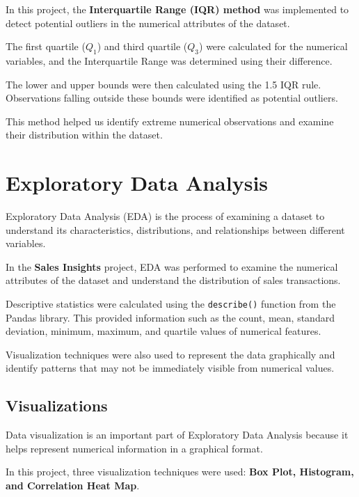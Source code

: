 \documentclass[12pt,a4paper]{report}
\begin{document}
In this project, the
\textbf{Interquartile Range (IQR) method}
was implemented to detect potential
outliers in the numerical attributes
of the dataset.

The first quartile ($Q_1$) and third
quartile ($Q_3$) were calculated for
the numerical variables, and the
Interquartile Range was determined
using their difference.

The lower and upper bounds were
then calculated using the
1.5 IQR rule. Observations falling
outside these bounds were identified
as potential outliers.

This method helped us identify
extreme numerical observations
and examine their distribution
within the dataset.

\endgroup

\chapter{Exploratory Data Analysis}

\begingroup
\fontsize{14}{21}\selectfont

Exploratory Data Analysis (EDA) is the process
of examining a dataset to understand its
characteristics, distributions, and relationships
between different variables.

In the \textbf{Sales Insights} project,
EDA was performed to examine the numerical
attributes of the dataset and understand
the distribution of sales transactions.

Descriptive statistics were calculated
using the \texttt{describe()} function
from the Pandas library. This provided
information such as the count, mean,
standard deviation, minimum, maximum,
and quartile values of numerical features.

Visualization techniques were also used
to represent the data graphically and
identify patterns that may not be
immediately visible from numerical values.


\section{Visualizations}

Data visualization is an important part
of Exploratory Data Analysis because
it helps represent numerical information
in a graphical format.

In this project, three visualization
techniques were used:
\textbf{Box Plot, Histogram, and
Correlation Heat Map}.
\end{document}
